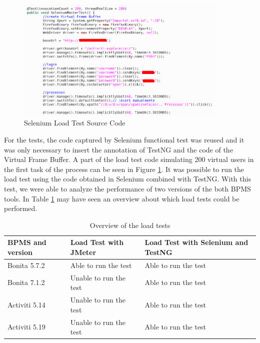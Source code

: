 \documentclass[runningheads,a4paper]{llncs}
\begin{document}
\begin{figure}[ht]
\centering
\includegraphics[width=0.9\textwidth]{figuras/codigoCargaSelenium.png}
\caption{Selenium Load Test Source Code}
\label{fig:codigoCargaSelenium}
\end{figure}


For the tests, the code captured by Selenium functional test was reused and it was only necessary to insert the annotation of TestNG and the code of the Virtual Frame Buffer. A part of the load test code simulating 200 virtual users in the first task of the process can be seen in Figure \ref{fig:codigoCargaSelenium}. It was possible to run the load test using the code obtained in Selenium combined with TestNG. With this test, we were able to analyze the performance of two versions of the both BPMS tools. In Table \ref{tab:foiPossivelCarga} may have seen an overview about which load tests could be performed. 

\begin{table}
\centering
\begin{tabular}{p{3cm}|p{3cm}|p{3cm}}
\hline
BPMS and version & Load Test with JMeter & Load Test with Selenium and TestNG \\\hline
Bonita 5.7.2 & Able to run the test & Able to run the test \\\hline
Bonita 7.1.2 & Unable to run the test & Able to run the test \\\hline
Activiti 5.14 & Unable to run the test & Able to run the test \\\hline
Activiti 5.19 & Unable to run the test & Able to run the test \\\hline
\end{tabular}
\caption{Overview of the load tests}
\label{tab:foiPossivelCarga}
\end{table}
\end{document}
